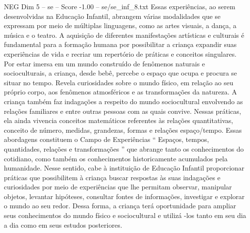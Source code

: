 \begin{textsample}{NEG Dim 5 – se – Score -1.00 – se/se\_inf\_8.txt}
Essas experiências, ao serem desenvolvidas na Educação Infantil, abrangem várias modalidades que se expressam por meio de múltiplas linguagens, como as artes visuais, a dança, a música e o teatro.
A aquisição de diferentes manifestações artísticas e culturais é fundamental para a formação humana por possibilitar a criança expandir suas experiências de vida e recriar um repertório de práticas e conceitos singulares.
Por estar imersa em um mundo construído de fenômenos naturais e socioculturais, a criança, desde bebê, percebe o espaço que ocupa e procura se situar no tempo.
Revela curiosidades sobre o mundo físico, em relação ao seu próprio corpo, aos fenômenos atmosféricos e as transformações da natureza.
A criança também faz indagações a respeito do mundo sociocultural envolvendo as relações familiares e entre outras pessoas com as quais convive.
Nessas práticas, ela ainda vivencia conceitos matemáticos referentes às relações quantitativas, conceito de número, medidas, grandezas, formas e relações espaço/tempo.
Essas abordagens constituem o Campo de Experiências “ Espaços, tempos, quantidades, relações e transformações ” que abrange tanto os conhecimentos do cotidiano, como também os conhecimentos historicamente acumulados pela humanidade.
Nesse sentido, cabe à instituição de Educação Infantil proporcionar práticas que possibilitem à criança buscar respostas às suas indagações e curiosidades por meio de experiências que lhe permitam observar, manipular objetos, levantar hipóteses, consultar fontes de informações, investigar e explorar o mundo ao seu redor.
Dessa forma, a criança terá oportunidade para ampliar seus conhecimentos do mundo físico e sociocultural e utilizá -los tanto em seu dia a dia como em seus estudos posteriores.

\end{textsample}

